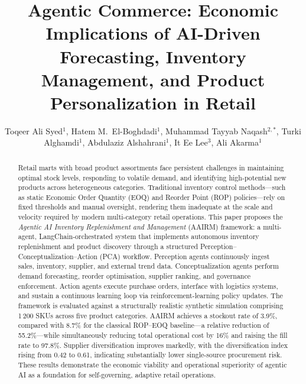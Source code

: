 \documentclass[utf8]{FrontiersinHarvard}
\def\firstAuthorLast{Syed et~al.}
\def\Authors{
	Toqeer Ali Syed$^{1}$,
	Hatem M.\ El-Boghdadi$^{1}$,
	Muhammad Tayyab Naqash$^{2,*}$,
	Turki Alghamdi$^{1}$,
	Abdulaziz Alshahrani$^{1}$,
	It Ee Lee$^{3}$,
	Ali Akarma$^{1}$
}
\begin{document}
	\onecolumn

	\title[Agentic Commerce]{Agentic Commerce: Economic Implications of
		AI-Driven Forecasting, Inventory Management, and Product
		Personalization in Retail}

	\author[\firstAuthorLast]{\Authors}
	\address{}
	\correspondance{}
	\extraAuth{}

	\maketitle

	\begin{abstract}

	Retail marts with broad product assortments face persistent challenges in
	maintaining optimal stock levels, responding to volatile demand, and
	identifying high-potential new products across heterogeneous categories.
	Traditional inventory control methods---such as static Economic Order
	Quantity (EOQ) and Reorder Point (ROP) policies---rely on fixed thresholds
	and manual oversight, rendering them inadequate at the scale and velocity
	required by modern multi-category retail operations.  This paper proposes
	the \emph{Agentic AI Inventory Replenishment and Management} (AAIRM)
	framework: a multi-agent, LangChain-orchestrated system that implements
	autonomous inventory replenishment and product discovery through a structured
	Perception--Conceptualization--Action (PCA) workflow.  Perception agents
	continuously ingest sales, inventory, supplier, and external trend data.
	Conceptualization agents perform demand forecasting, reorder optimisation,
	supplier ranking, and governance enforcement.  Action agents execute
	purchase orders, interface with logistics systems, and sustain a
	continuous learning loop via reinforcement-learning policy updates.  The
	framework is evaluated against a structurally realistic synthetic simulation
	comprising 1\,200 SKUs across five product categories.  AAIRM achieves
	a stockout rate of 3.9\%, compared with 8.7\% for the classical ROP--EOQ
	baseline---a relative reduction of 55.2\%---while simultaneously reducing
	total operational cost by 16\% and raising the fill rate to 97.8\%.
	Supplier diversification improves markedly, with the diversification index
	rising from 0.42 to 0.61, indicating substantially lower single-source
	procurement risk.  These results demonstrate the economic viability and
	operational superiority of agentic AI as a foundation for self-governing,
	adaptive retail operations.

	\tiny
	\end{abstract}
\end{document}
